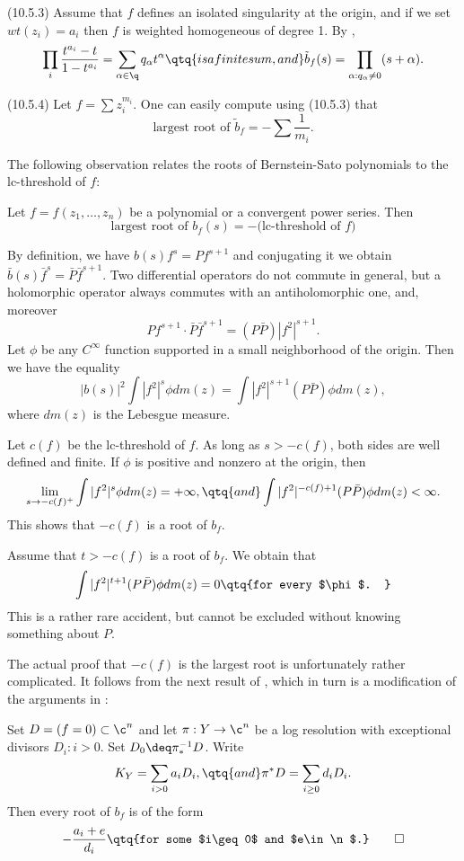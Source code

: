 (10.5.3) Assume that $f$ defines an isolated singularity at the origin, and if
we set
$wt(z_i)=a_i$ then $f$ is weighted homogeneous of degree 1.  By
\cite{Yano78}, 
$$
\prod_i\frac{t^{a_i}-t}{1-t^{a_i}}=\sum_{\alpha\in \q} q_{\alpha}t^{\alpha}
\qtq{is  a finite sum, and}
\tilde b_f(s)=\prod_{\alpha:q_{\alpha}\neq 0}(s+\alpha).
$$

(10.5.4) Let $f=\sum z_i^{m_i}$.  One can easily compute using (10.5.3) that
$$
\text{largest root of $\tilde b_f$}=-\sum \frac1{m_i}.
$$
\enddemo

The following   observation relates the roots of 
Bernstein-Sato polynomials to the lc-threshold of $f$:

 Let $f=f(z_1,\dots,z_n)$ be
a polynomial or a convergent power series. Then 
$$
\text{largest root of $b_f(s)$}= -\text{(lc-threshold of $f$)}
$$
\endproclaim

\demop By definition, we have $b(s)f^{s}=Pf^{s+1}$ and conjugating it we
obtain
$\bar b(s)\bar f^{s}=\bar P\bar f^{s+1}$. Two differential operators do not
commute in general, but a holomorphic operator always commutes with an
antiholomorphic one, and, moreover
$$
Pf^{s+1}\cdot \bar P\bar f^{s+1}=(P\bar P)|f^2|^{s+1}.
$$
Let $\phi$ be any $C^{\infty}$ function supported in a small
neighborhood of the origin. Then we have the equality
$$
|b(s)|^2\int |f^2|^s\phi dm(z)=
\int |f^2|^{s+1}(P\bar P)\phi d m(z),
$$
where $dm(z)$ is the Lebesgue measure.

Let $c(f)$ be the lc-threshold of $f$.
As long as $s>-c(f)$, both sides are well defined and
finite.  If $\phi$ is positive and nonzero at the origin, then
$$
\lim_{s\to -c(f)^+}\int |f^2|^s\phi dm(z)=+\infty,
\qtq{and}
\int |f^2|^{-c(f)+1} (P\bar P)\phi d m(z)<\infty.
$$
This shows that $-c(f)$ is a root of $b_f$.

Assume that $t>-c(f)$ is a root of $b_f$. We obtain that
$$
\int |f^2|^{t+1} (P\bar P)\phi d m(z)=0\qtq{for every $\phi$. }
$$
This is a rather rare accident, but cannot be excluded
without knowing something about $P$.

The actual proof that $-c(f)$ is the largest root is unfortunately rather
complicated. It follows from the next result of \cite{Lichtin89, Thm. 5}, which
in turn is a modification of the arguments in \cite{Kashiwara76}:


 Set $D=(f=0)\subset \c^n$ and let $\pi:Y\to \c^n$ be a 
log resolution with exceptional divisors $D_i: i>0$. Set $D_0\deq
\pi^{-1}_*D$. Write
$$
K_Y=\sum_{i>0} a_iD_i,\qtq{and} \pi^*D=\sum_{i\geq 0} d_iD_i.
$$
Then every root of $b_f$ is of the form
$$
-\frac{a_i+e}{d_i} \qtq{for some $i\geq 0$ and $e\in \n$.}\qed
$$
\endproclaim

